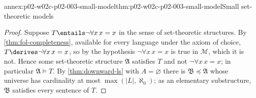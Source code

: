 \begin{annexitem}{annex:p02-w02c-p02-003-small-model}{thm:p02-w02c-p02-003-small-model}{Small set-theoretic models}
\begin{proof}
Suppose \(T\entails\neg\forall x\,x=x\) in the sense of set-theoretic
structures.  By \cref{thm:fol-completeness}, available for every language
under the axiom of choice, \(T\derives\neg\forall x\,x=x\), so by the
hypothesis \(\neg\forall x\,x=x\) is true in \(\mathcal M\), which it is
not.  Hence some set-theoretic structure \(\mathfrak A\) satisfies \(T\) and
not \(\neg\forall x\,x=x\); in particular \(\mathfrak A\models T\).  By
\cref{thm:downward-ls} with \(A=\varnothing\) there is
\(\mathfrak B\preccurlyeq\mathfrak A\) whose universe has cardinality at
most \(\max(\lvert L\rvert,\aleph_0)\); as an elementary substructure,
\(\mathfrak B\) satisfies every sentence of \(T\).
\end{proof}
\end{annexitem}

